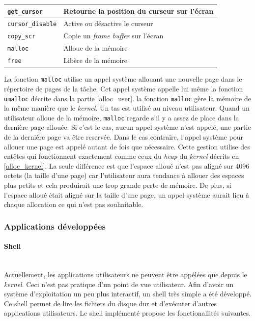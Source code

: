 \begin{center}
{\begin{tabular}{| l | l |}
            \texttt{get_cursor} & Retourne la position du curseur sur
            l'écran \\ \hline
            \texttt{cursor_disable} & Active ou désactive le curseur \\ \hline
            \texttt{copy_scr} & Copie un \textit{frame buffer} sur
            l'écran \\ \hline
            \texttt{malloc} & Alloue de la mémoire \\ \hline
            \texttt{free} & Libère de la mémoire \\ \hline
		\end{tabular}
	}
    \label{tab:tasks:ulibc}
\end{center}

La fonction \texttt{malloc} utilise un appel système allouant une nouvelle
page dans le répertoire de pages de la tâche. Cet appel système appelle lui même
la fonction \texttt{umalloc} décrite dans la partie \ref{alloc_user}.
la fonction \texttt{malloc} gère la mémoire de la même manière que le
\textit{kernel}. Un tas est utilisé au niveau utilisateur. Quand un utilisateur
alloue de la mémoire, \texttt{malloc} regarde s'il y a assez de
place dans la dernière page allouée. Si c'est le cas, aucun appel système n'est
appelé, une partie de la dernière page va être reservée. Dans le cas contraire,
l'appel système pour allouer une page est appelé autant de fois que nécessaire.
Cette gestion utilise des entêtes qui fonctionnent exactement comme ceux du
\textit{heap} du \textit{kernel} décrits en \ref{alloc_kernel}. La seule différence
est que l'espace alloué n'est pas aligné sur 4096 octets (la taille d'une page)
car l'utilisateur aura tendance à allouer des espaces plus petits et cela produirait
une trop grande perte de mémoire. De plus, si l'espace alloué était aligné sur
la taille d'une page, un appel système aurait lieu à chaque allocation ce qui n'est
pas souhaitable.

\subsubsection{Applications développées}
\paragraph{Shell} \mbox{} \\
Actuellement, les applications utilisateurs ne peuvent être appélées que depuis
le \textit{kernel}. Ceci n'est pas pratique d'un point de vue utilisateur.
Afin d'avoir un système d'exploitation un peu plus interactif, un shell très
simple a été développé. Ce shell permet de lire les fichiers du disque dur et
d'exécuter d'autres applications utilisateurs. Le shell implémenté propose
les fonctionallités suivantes.

